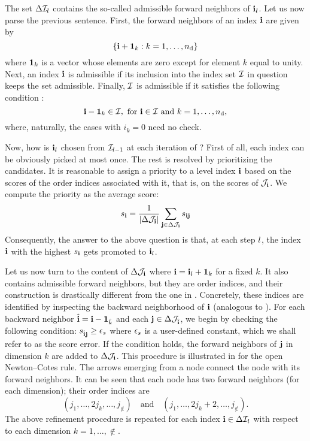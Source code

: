 The set $\Delta\mathcal{I}_l$ contains the so-called admissible forward neighbors
of $\mathbf{i}_l$. Let us now parse the previous sentence. First, the forward
neighbors of an index $\mathbf{i}$ are given by
\begin{equation} \elab{forward-level-neighbors}
  \left\{ \vi + \v{1}_k: k = 1, \dots, \nin \right\}
\end{equation}
where $\mathbf{1}_k$ is a vector whose elements are zero except for element $k$ equal
to unity. Next, an index $\mathbf{i}$ is admissible if its inclusion into the index set
$\mathcal{I}$ in question keeps the set admissible. Finally, $\mathcal{I}$ is admissible
if it satisfies the following condition \cite{klimke2006}:
\begin{equation} \elab{admissibility}
  \vi - \v{1}_k \in \lindex, \text{ for $\vi \in \lindex$ and $k = 1, \dots, \nin$,}
\end{equation}
where, naturally, the cases with $i_k = 0$ need no check.

Now, how is $\mathbf{i}_l$ chosen from $\mathcal{I}_{l-1}$ at each iteration of
? First of all, each index can be obviously picked at most
once. The rest is resolved by prioritizing the candidates. It is reasonable to
assign a priority to a level index $\mathbf{i}$ based on the scores of the order
indices associated with it, that is, on the scores of $\mathcal{J}_{\mathbf{i}}$. We compute
the priority as the average score:
\[
  s_{\mathbf{i}} = \frac{1}{\left| \Delta\mathcal{J}_{\mathbf{i}} \right|} \sum_{\mathbf{j} \in \Delta\mathcal{J}_{\mathbf{i}}} s_{\mathbf{i}\mathbf{j}}
\]
Consequently, the answer to the above question is that, at each step $l$, the
index $\mathbf{i}$ with the highest $s_{\mathbf{i}}$ gets promoted to $\mathbf{i}_l$.

Let us now turn to the content of $\Delta\mathcal{J}_{\mathbf{i}}$ where $\mathbf{i} = \mathbf{i}_l +
\mathbf{1}_k$ for a fixed $k$. It also contains admissible forward neighbors, but
they are order indices, and their construction is drastically different from the
one in . Concretely, these indices are identified
by inspecting the backward neighborhood of $\mathbf{i}$ (analogous to
). For each backward neighbor $\hat{\mathbf{i}} = \mathbf{i} -
\mathbf{1}_{\hat{k}}$ and each $\mathbf{j} \in \Delta\mathcal{J}_{\hat{\mathbf{i}}}$, we begin by
checking the following condition: $s_{\hat{\mathbf{i}}\mathbf{j}} \geq \epsilon_s$ where
$\epsilon_s$ is a user-defined constant, which we shall refer to as the score
error. If the condition holds, the forward neighbors of $\mathbf{j}$ in dimension $k$
are added to $\Delta\mathcal{J}_{\mathbf{i}}$. This procedure is illustrated in 
for the open Newton--Cotes rule. The arrows emerging from a node connect the
node with its forward neighbors. It can be seen that each node has two forward
neighbors (for each dimension); their order indices are
\[
  (j_1, \dots, 2 j_k, \dots, j_\nin) \hspace{1em} \text{and} \hspace{1em} (j_1, \dots, 2 j_k + 2, \dots, j_\nin).
\]
The above refinement procedure is repeated for each index $\mathbf{i} \in
\Delta\mathcal{I}_l$ with respect to each dimension $k = 1, \dots, \nin$.

